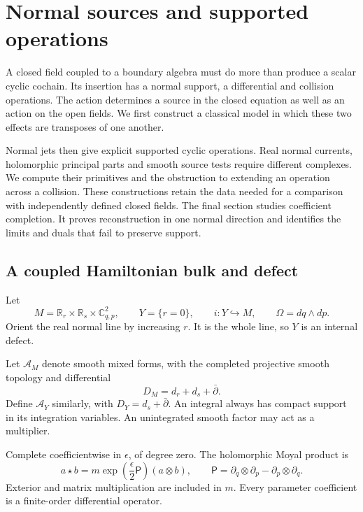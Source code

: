 \chapter{Normal sources and supported operations}
\label{mht:ch:normal-sources}

A closed field coupled to a boundary algebra must do more than
produce a scalar cyclic cochain. Its insertion has a normal
support, a differential and collision operations. The action
determines a source in the closed equation as well as an action
on the open fields. We first construct a classical model in
which these two effects are transposes of one another.

Normal jets then give explicit supported cyclic operations.
Real normal currents, holomorphic principal parts and smooth
source tests require different complexes. We compute their
primitives and the obstruction to extending an operation across
a collision. These constructions retain the data needed for
a comparison with independently defined closed fields.
The final section studies coefficient completion. It proves
reconstruction in one normal direction and identifies the
limits and duals that fail to preserve support.

\section{A coupled Hamiltonian bulk and defect}

Let
\[
 M=\mathbb R_r\times\mathbb R_s\times\mathbb C^2_{q,p},
 \qquad Y=\{r=0\},\qquad i:Y\hookrightarrow M,
 \qquad \Omega=dq\wedge dp.
\]
Orient the real normal line by increasing $r$. It is the whole
line, so $Y$ is an internal defect.

Let $\mathcal A_M$ denote
smooth mixed forms, with the completed projective smooth
topology and differential
\[
 D_M=d_r+d_s+\bar\partial.
\]
Define $\mathcal A_Y$ similarly, with $D_Y=d_s+\bar\partial$.
An integral always has compact support in its integration
variables. An unintegrated smooth factor may act as a multiplier.

Complete coefficientwise in $\epsilon$, of degree zero. The
holomorphic Moyal product is
\begin{equation}\label{mht:eq:geometric-moyal}
 a\star b=m\exp\!\left(\frac\epsilon2\mathsf P\right)(a\otimes b),
 \qquad
 \mathsf P=\partial_q\otimes\partial_p
                    -\partial_p\otimes\partial_q.
\end{equation}
Exterior and matrix multiplication are included in $m$.
Every parameter coefficient is a finite-order differential
operator.

